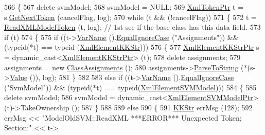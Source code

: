 \begin{DoxyCode}
566 \{
567   \textcolor{keyword}{delete}  svmModel;
568   svmModel = NULL;
569   \hyperlink{class_k_k_b_1_1_xml_token}{XmlTokenPtr}  t = s.\hyperlink{class_k_k_b_1_1_xml_stream_a87cc738b05c666cf5d5c25beaab477b4}{GetNextToken} (cancelFlag, log);
570   \textcolor{keywordflow}{while}  (t   &&  (!cancelFlag))
571   \{
572     t = \hyperlink{class_k_k_m_l_l_1_1_model_a9feaeb8870d1f137b74586bb434b09d2}{ReadXMLModelToken} (t, log);  \textcolor{comment}{// 1st see if the base class has this data field.}
573     \textcolor{keywordflow}{if}  (t)
574     \{
575       \textcolor{keywordflow}{if}  ((t->\hyperlink{class_k_k_b_1_1_xml_token_a28b39cfdfa2ed63048a812b1cb52263c}{VarName} ().\hyperlink{class_k_k_b_1_1_k_k_str_a562f9696417c53f66bc4088eac072ab5}{EqualIgnoreCase} (\textcolor{stringliteral}{"Assignments"}))  &&  (\textcolor{keyword}{typeid}(*t) == \textcolor{keyword}{typeid}
      (\hyperlink{class_k_k_b_1_1_xml_element_k_k_str}{XmlElementKKStr})))
576       \{
577         \hyperlink{class_k_k_b_1_1_xml_element_k_k_str}{XmlElementKKStrPtr} s = \textcolor{keyword}{dynamic\_cast<}\hyperlink{class_k_k_b_1_1_xml_element_k_k_str}{XmlElementKKStrPtr}\textcolor{keyword}{>} (t);
578         \textcolor{keyword}{delete}  assignments;
579         assignments = \textcolor{keyword}{new} \hyperlink{class_k_k_m_l_l_1_1_class_assignments}{ClassAssignments} ();
580         assignments->\hyperlink{class_k_k_m_l_l_1_1_class_assignments_a741ad292e58ea0dcd057776fa0a62da7}{ParseToString} (*(s->\hyperlink{class_k_k_b_1_1_xml_element_template_a3d671b57251b4b256fecb2197fc4a0f4}{Value} ()), log);
581       \}
582 
583       \textcolor{keywordflow}{else} \textcolor{keywordflow}{if}  ((t->\hyperlink{class_k_k_b_1_1_xml_token_a28b39cfdfa2ed63048a812b1cb52263c}{VarName} ().\hyperlink{class_k_k_b_1_1_k_k_str_a562f9696417c53f66bc4088eac072ab5}{EqualIgnoreCase} (\textcolor{stringliteral}{"SvmModel"}))  &&  (\textcolor{keyword}{typeid}(*t) == \textcolor{keyword}{
      typeid}(\hyperlink{namespace_k_k_m_l_l_abd686e81c259a1d4d8433acc9365c62e}{XmlElementSVMModel})))
584       \{
585         \textcolor{keyword}{delete}  svmModel;
586         svmModel = \textcolor{keyword}{dynamic\_cast<}\hyperlink{class_k_k_b_1_1_xml_element_template}{XmlElementSVMModelPtr}\textcolor{keyword}{>} (t)->TakeOwnership ();
587       \}
588 
589       \textcolor{keywordflow}{else}
590       \{
591         \hyperlink{class_k_k_b_1_1_k_k_str}{KKStr} errMsg (128);
592         errMsg << \textcolor{stringliteral}{"ModelOldSVM::ReadXML  ***ERROR***  Unexpected Token;  Section:"} << t->

\end{DoxyCode}
